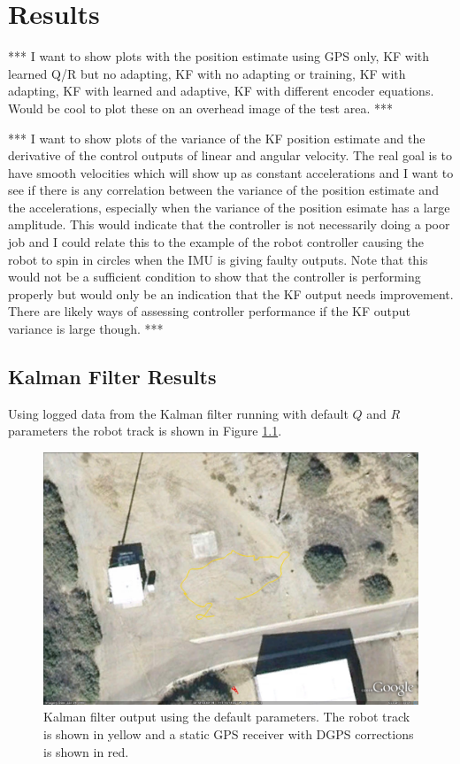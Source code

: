 \chapter{Results}
\label{ch:results}
*** I want to show plots with the position estimate using GPS only, KF with learned Q/R but no adapting, KF with no adapting or training, KF with adapting, KF with learned and adaptive, KF with different encoder equations. Would be cool to plot these on an overhead image of the test area. ***

*** I want to show plots of the variance of the KF position estimate and the derivative of the control outputs of linear and angular velocity. The real goal is to have smooth velocities which will show up as constant accelerations and I want to see if there is any correlation between the variance of the position estimate and the accelerations, especially when the variance of the position esimate has a large amplitude. This would indicate that the controller is not necessarily doing a poor job and I could relate this to the example of the robot controller causing the robot to spin in circles when the IMU is giving faulty outputs. Note that this would not be a sufficient condition to show that the controller is performing properly but would only be an indication that the KF output needs improvement. There are likely ways of assessing controller performance if the KF output variance is large though. ***

\section{Kalman Filter Results}
\label{sec:kfResults}
Using logged data from the Kalman filter running with default $Q$ and $R$ parameters the robot track is shown in Figure \ref{fig:kfPlainDataFirstAttempt}.

\begin{figure}[ht!]
	\centering
	\includegraphics[width=.95\textwidth]{images/kfPlainDataFirstAttempt}
	\caption{Kalman filter output using the default parameters. The robot track is shown in yellow and a static GPS receiver with DGPS corrections is shown in red.}
	\label{fig:kfPlainDataFirstAttempt}
\end{figure}

